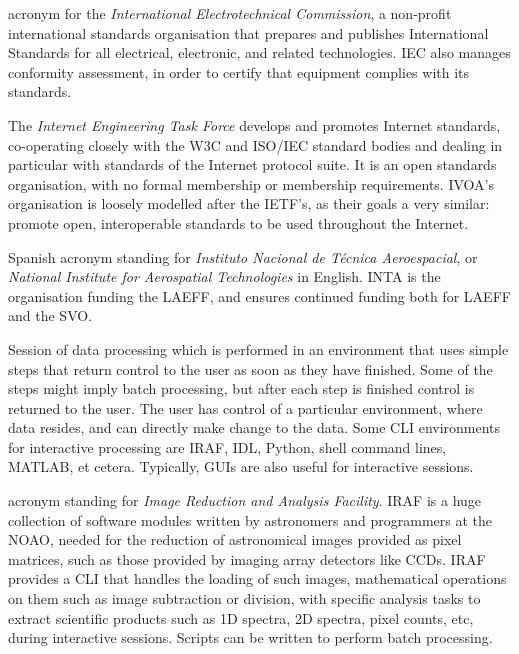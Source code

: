 {
    	acronym for the \emph{International Electrotechnical
        Commission}, a non-profit international standards organisation
        that prepares and publishes International Standards for all
        electrical, electronic, and related technologies. IEC also
        manages conformity assessment, in order to certify that
        equipment complies with its standards.
}

{
    	The \emph{Internet Engineering Task Force} develops and
        promotes Internet standards, co-operating closely with the
        \gls{W3C} and \gls{ISO}/\gls{IEC} standard bodies and dealing
        in particular with standards of the \gls{Internet}
        \gls{protocol suite}. It is an open standards organisation,
        with no formal membership or membership requirements.
        \gls{IVOA}'s organisation is loosely modelled after the IETF's,
        as their goals a very similar: promote open, interoperable
        standards to be used throughout the Internet.
}

{
    	Spanish acronym standing for \emph{Instituto Nacional de
        Técnica Aeroespacial}, or \emph{National Institute for
        Aerospatial Technologies} in English. INTA is the organisation
        funding the \gls{LAEFF}, and ensures continued funding both for
        LAEFF and the \gls{SVO}.
}

{
    	Session of data processing which is performed in an environment
        that uses simple steps that return control to the user as soon
        as they have finished. Some of the steps might imply \gls{batch
        processing}, but after each step is finished control is
        returned to the user. The user has control of a particular
        environment, where data resides, and can directly make change
        to the data. Some \gls{CLI} environments for interactive
        processing are \gls{IRAF}, \gls{IDL}, \gls{Python}, \gls{shell}
        command lines, \gls{MATLAB}, et cetera.
		Typically, \gls{GUI}s are also
        useful for interactive sessions.
}

{
    	acronym standing for \emph{Image Reduction and Analysis
        Facility}. IRAF is a huge collection of software modules
        written by astronomers and programmers at the \gls{NOAO},
        needed for the \gls{reduction} of astronomical images provided
        as pixel matrices, such as those provided by imaging array
        detectors like CCDs. IRAF provides a \gls{CLI} that handles the
        loading of such images, mathematical operations on them such as
        image subtraction or division, with specific analysis tasks to
        extract scientific products such as 1D spectra, 2D spectra,
        pixel counts, etc, during \gls{interactive sessions}. Scripts
        can be written to perform \gls{batch processing}.
}

